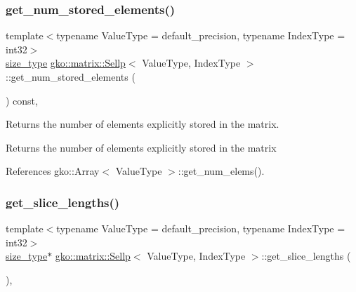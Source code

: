 \subsubsection{\texorpdfstring{get\+\_\+num\+\_\+stored\+\_\+elements()}{get\_num\_stored\_elements()}}
{\footnotesize\ttfamily template$<$typename Value\+Type = default\+\_\+precision, typename Index\+Type = int32$>$ \\
\hyperlink{namespacegko_a6e5c95df0ae4e47aab2f604a22d98ee7}{size\+\_\+type} \hyperlink{classgko_1_1matrix_1_1Sellp}{gko\+::matrix\+::\+Sellp}$<$ Value\+Type, Index\+Type $>$\+::get\+\_\+num\+\_\+stored\+\_\+elements (\begin{DoxyParamCaption}{ }\end{DoxyParamCaption}) const\hspace{0.3cm}{\ttfamily [inline]}, {\ttfamily [noexcept]}}



Returns the number of elements explicitly stored in the matrix. 

\begin{DoxyReturn}{Returns}
the number of elements explicitly stored in the matrix 
\end{DoxyReturn}


References gko\+::\+Array$<$ Value\+Type $>$\+::get\+\_\+num\+\_\+elems().

\mbox{\label{classgko_1_1matrix_1_1Sellp_ab22f4de41d95db19e96433dc4583f512}} 
\subsubsection{\texorpdfstring{get\+\_\+slice\+\_\+lengths()}{get\_slice\_lengths()}}
{\footnotesize\ttfamily template$<$typename Value\+Type = default\+\_\+precision, typename Index\+Type = int32$>$ \\
\hyperlink{namespacegko_a6e5c95df0ae4e47aab2f604a22d98ee7}{size\+\_\+type}$\ast$ \hyperlink{classgko_1_1matrix_1_1Sellp}{gko\+::matrix\+::\+Sellp}$<$ Value\+Type, Index\+Type $>$\+::get\+\_\+slice\+\_\+lengths (\begin{DoxyParamCaption}{ }\end{DoxyParamCaption})\hspace{0.3cm}{\ttfamily [inline]}, {\ttfamily [noexcept]}}



